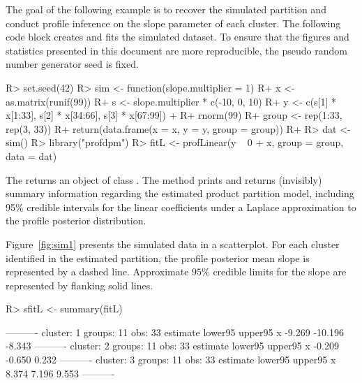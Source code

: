 \documentclass[article, nojss]{jss}
\begin{document}
The goal of the following example is to recover the simulated partition and conduct profile inference on the slope parameter of each cluster. The following  code block creates and fits the simulated dataset. To ensure that the figures and statistics presented in this document are more reproducible, the pseudo random number generator seed is fixed. 
\begin{Schunk}
\begin{Sinput}
R> set.seed(42)
R> sim <- function(slope.multiplier = 1) {
R+     x <- as.matrix(runif(99))
R+     s <- slope.multiplier * c(-10, 0, 10)
R+     y <- c(s[1] * x[1:33], s[2] * x[34:66], s[3] * x[67:99]) + 
R+         rnorm(99)
R+     group <- rep(1:33, rep(3, 33))
R+     return(data.frame(x = x, y = y, group = group))
R+ }
R> dat <- sim()
R> library("profdpm")
R> fitL <- profLinear(y ~ 0 + x, group = group, data = dat)
\end{Sinput}
\end{Schunk}
The  returns an object of class . The  method prints and returns (invisibly) summary information regarding the estimated product partition model, including 95\% credible intervals for the linear coefficients under a Laplace approximation to the profile posterior distribution.

Figure~\ref{fig:sim1} presents the simulated data in a scatterplot. For each cluster identified in the estimated partition, the profile posterior mean slope is represented by a dashed line. Approximate $95\%$ credible limits for the slope are represented by flanking solid lines.

\begin{Schunk}
\begin{Sinput}
R> sfitL <- summary(fitL)
\end{Sinput}
\begin{Soutput}
----------
cluster: 1
groups:  11
obs:     33
  estimate lower95 upper95
x   -9.269 -10.196  -8.343
----------
cluster: 2
groups:  11
obs:     33
  estimate lower95 upper95
x   -0.209  -0.650   0.232
----------
cluster: 3
groups:  11
obs:     33
  estimate lower95 upper95
x    8.374   7.196   9.553
----------
\end{Soutput}
\end{Schunk}
\end{document}
